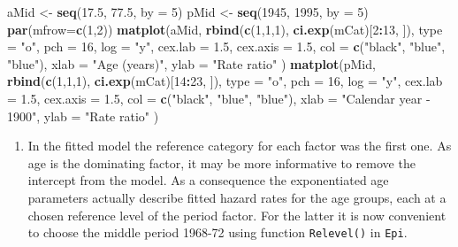 \documentclass[
]{book}
\newenvironment{Shaded}{\begin{snugshade}}{\end{snugshade}}
\newcommand{\AttributeTok}[1]{\textcolor[rgb]{0.13,0.29,0.53}{#1}}
\newcommand{\DecValTok}[1]{\textcolor[rgb]{0.00,0.00,0.81}{#1}}
\newcommand{\FloatTok}[1]{\textcolor[rgb]{0.00,0.00,0.81}{#1}}
\newcommand{\FunctionTok}[1]{\textcolor[rgb]{0.13,0.29,0.53}{\textbf{#1}}}
\newcommand{\NormalTok}[1]{#1}
\newcommand{\OtherTok}[1]{\textcolor[rgb]{0.56,0.35,0.01}{#1}}
\newcommand{\SpecialCharTok}[1]{\textcolor[rgb]{0.81,0.36,0.00}{\textbf{#1}}}
\newcommand{\StringTok}[1]{\textcolor[rgb]{0.31,0.60,0.02}{#1}}
\providecommand{\tightlist}{%
  \setlength{\itemsep}{0pt}\setlength{\parskip}{0pt}}
\begin{document}
\begin{Shaded}
\begin{Highlighting}[]
\NormalTok{aMid }\OtherTok{\textless{}{-}} \FunctionTok{seq}\NormalTok{(}\FloatTok{17.5}\NormalTok{, }\FloatTok{77.5}\NormalTok{, }\AttributeTok{by =} \DecValTok{5}\NormalTok{)}
\NormalTok{pMid }\OtherTok{\textless{}{-}} \FunctionTok{seq}\NormalTok{(}\DecValTok{1945}\NormalTok{, }\DecValTok{1995}\NormalTok{, }\AttributeTok{by =} \DecValTok{5}\NormalTok{)}
\FunctionTok{par}\NormalTok{(}\AttributeTok{mfrow=}\FunctionTok{c}\NormalTok{(}\DecValTok{1}\NormalTok{,}\DecValTok{2}\NormalTok{))}
\FunctionTok{matplot}\NormalTok{(aMid, }\FunctionTok{rbind}\NormalTok{(}\FunctionTok{c}\NormalTok{(}\DecValTok{1}\NormalTok{,}\DecValTok{1}\NormalTok{,}\DecValTok{1}\NormalTok{), }\FunctionTok{ci.exp}\NormalTok{(mCat)[}\DecValTok{2}\SpecialCharTok{:}\DecValTok{13}\NormalTok{, ]), }\AttributeTok{type =} \StringTok{"o"}\NormalTok{, }\AttributeTok{pch =} \DecValTok{16}\NormalTok{,}
   \AttributeTok{log =} \StringTok{"y"}\NormalTok{, }\AttributeTok{cex.lab =} \FloatTok{1.5}\NormalTok{, }\AttributeTok{cex.axis =} \FloatTok{1.5}\NormalTok{, }
   \AttributeTok{col =} \FunctionTok{c}\NormalTok{(}\StringTok{"black"}\NormalTok{, }\StringTok{"blue"}\NormalTok{, }\StringTok{"blue"}\NormalTok{),}
  \AttributeTok{xlab =} \StringTok{"Age (years)"}\NormalTok{, }\AttributeTok{ylab =} \StringTok{"Rate ratio"}\NormalTok{ )}
\FunctionTok{matplot}\NormalTok{(pMid, }\FunctionTok{rbind}\NormalTok{(}\FunctionTok{c}\NormalTok{(}\DecValTok{1}\NormalTok{,}\DecValTok{1}\NormalTok{,}\DecValTok{1}\NormalTok{), }\FunctionTok{ci.exp}\NormalTok{(mCat)[}\DecValTok{14}\SpecialCharTok{:}\DecValTok{23}\NormalTok{, ]), }\AttributeTok{type =} \StringTok{"o"}\NormalTok{, }\AttributeTok{pch =} \DecValTok{16}\NormalTok{,}
   \AttributeTok{log =} \StringTok{"y"}\NormalTok{, }\AttributeTok{cex.lab =} \FloatTok{1.5}\NormalTok{, }\AttributeTok{cex.axis =} \FloatTok{1.5}\NormalTok{, }
   \AttributeTok{col =} \FunctionTok{c}\NormalTok{(}\StringTok{"black"}\NormalTok{, }\StringTok{"blue"}\NormalTok{, }\StringTok{"blue"}\NormalTok{),}
  \AttributeTok{xlab =} \StringTok{"Calendar year {-} 1900"}\NormalTok{, }\AttributeTok{ylab =} \StringTok{"Rate ratio"}\NormalTok{ )}
\end{Highlighting}
\end{Shaded}

\begin{enumerate}
\def\labelenumi{\arabic{enumi}.}
\setcounter{enumi}{2}
\tightlist
\item
  In the fitted model the reference category for each factor was the
  first one. As age is the dominating factor, it may be more
  informative to remove the intercept from the model. As a consequence
  the exponentiated age parameters actually describe fitted hazard
  rates for the age groups, each at a chosen reference level of the
  period factor. For the latter it is now convenient to choose the
  middle period 1968-72 using function \texttt{Relevel()} in \texttt{Epi}.
\end{enumerate}
\end{document}
